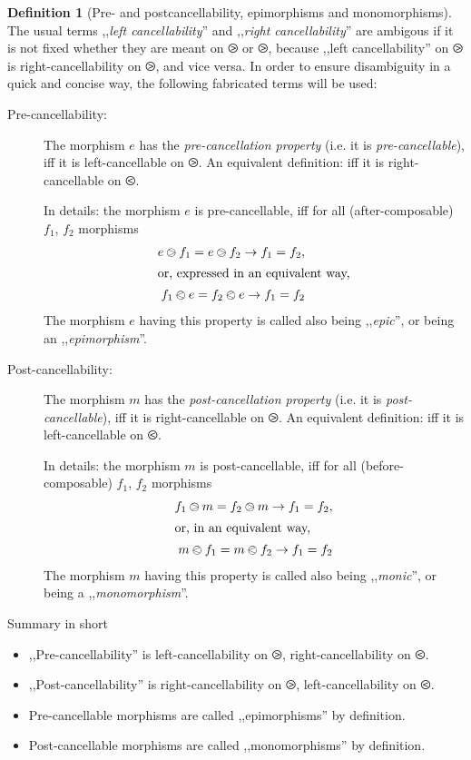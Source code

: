 \documentclass{article}
\theoremstyle{definition}
\newtheorem{dfn}{Definition}
\begin{document}
	\begin{dfn}[Pre- and postcancellability, epimorphisms and monomorphisms]
		The usual terms ,,\emph{left cancellability}'' and ,,\emph{right cancellability}'' are ambigous if it is not fixed whether they are meant on $\ogreaterthan$ or $\ogreaterthan$, because ,,left cancellability'' on $\ogreaterthan$ is right-cancellability on $\ogreaterthan$, and vice versa. In order to ensure disambiguity in a quick and concise way, the following fabricated terms will be used:
		\begin{description}
			\item[Pre-cancellability:] The morphism $e$ has the \emph{pre-cancellation property} (i.e. it is \emph{pre-cancellable}), iff it is left-cancellable on $\ogreaterthan$. An equivalent definition: iff it is right-cancellable on $\olessthan$.

			In details: the morphism $e$ is pre-cancellable, iff for all (after-composable) $f_1$, $f_2$ morphisms
			\begin{align}
				e \ogreaterthan f_1 = e \ogreaterthan f_2 \to f_1 = f_2,\\\intertext{or, expressed in an equivalent way,}
				f_1 \olessthan e = f_2 \olessthan e \to f_1 = f_2
			\end{align}
			The morphism $e$ having this property is called also being ,,\emph{epic}'', or being an ,,\emph{epimorphism}''.
			\item[Post-cancellability:]  The morphism $m$ has the \emph{post-cancellation property} (i.e. it is \emph{post-cancellable}), iff it is right-cancellable on $\ogreaterthan$. An equivalent definition: iff it is left-cancellable on $\olessthan$.

			In details:  the morphism $m$ is post-cancellable, iff for all (before-composable) $f_1$, $f_2$ morphisms
			\begin{align}
				f_1 \ogreaterthan m = f_2 \ogreaterthan m \to f_1 = f_2,\\\intertext{or, in an equivalent way,}
				m \olessthan f_1 = m \olessthan f_2 \to f_1 = f_2
			\end{align}
			The morphism $m$ having this property is called also being ,,\emph{monic}'', or being a ,,\emph{monomorphism}''.
		\end{description}
		Summary in short
		\begin{itemize}
			\item ,,Pre-cancellability'' is left-cancellability on $\ogreaterthan$, right-cancellability on $\olessthan$.
			\item ,,Post-cancellability'' is right-cancellability on $\ogreaterthan$, left-cancellability on $\olessthan$.
			\item Pre-cancellable morphisms are called ,,epimorphisms'' by definition.
			\item Post-cancellable morphisms are called ,,monomorphisms'' by definition.
		\end{itemize}
	\end{dfn}
\end{document}
